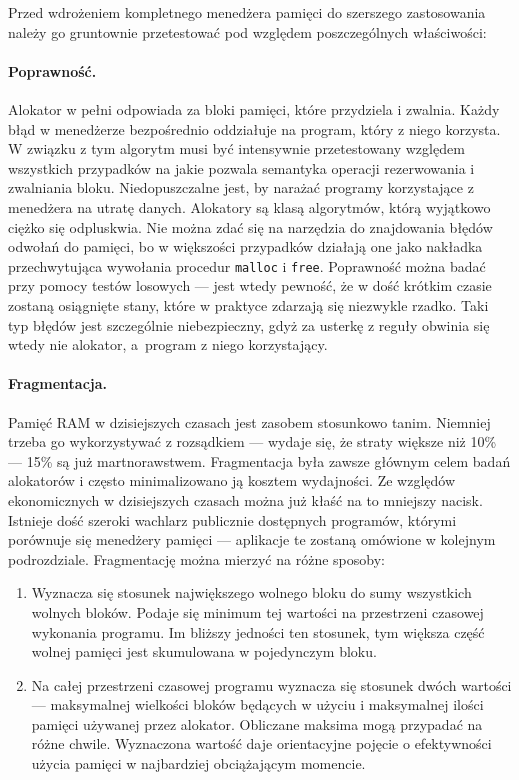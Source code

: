 \documentclass[12pt,a4paper,titlepage,twoside]{mwart}
\begin{document}
Przed wdrożeniem kompletnego menedżera pamięci do szerszego zastosowania należy
go gruntownie przetestować pod względem poszczególnych właściwości:

\paragraph{Poprawność.} Alokator w pełni odpowiada za bloki pamięci, które
przydziela i zwalnia. Każdy błąd w menedżerze bezpośrednio oddziałuje na
program, który z niego korzysta. W związku z tym algorytm musi być intensywnie
przetestowany względem wszystkich przypadków na jakie pozwala semantyka
operacji rezerwowania i zwalniania bloku. Niedopuszczalne jest, by narażać
programy korzystające z menedżera na utratę danych. Alokatory są klasą
algorytmów, którą wyjątkowo ciężko się odpluskwia. Nie można zdać się na
narzędzia do znajdowania błędów odwołań do pamięci, bo w większości przypadków
działają one jako nakładka przechwytująca wywołania procedur \texttt{malloc} i
\texttt{free}. Poprawność można badać przy pomocy testów losowych --- jest wtedy
pewność, że w dość krótkim czasie zostaną osiągnięte stany, które w praktyce
zdarzają się niezwykle rzadko. Taki typ błędów jest szczególnie niebezpieczny,
gdyż za usterkę z reguły obwinia się wtedy nie alokator, a~program z niego
korzystający.

\paragraph{Fragmentacja.} Pamięć RAM w dzisiejszych czasach jest zasobem
stosunkowo tanim. Niemniej trzeba go wykorzystywać z rozsądkiem --- wydaje się,
że straty większe niż 10\% --- 15\% są już martnorawstwem. Fragmentacja była
zawsze głównym celem badań alokatorów i często minimalizowano ją kosztem
wydajności. Ze względów ekonomicznych w dzisiejszych czasach można już kłaść na
to mniejszy nacisk. Istnieje dość szeroki wachlarz publicznie dostępnych
programów, którymi porównuje się menedżery pamięci --- aplikacje te zostaną
omówione w kolejnym podrozdziale. Fragmentację można mierzyć na różne sposoby:

\begin{enumerate}

\item Wyznacza się stosunek największego wolnego bloku do sumy wszystkich
wolnych bloków. Podaje się minimum tej wartości na przestrzeni czasowej
wykonania programu. Im bliższy jedności ten stosunek, tym większa część wolnej
pamięci jest skumulowana w pojedynczym bloku.

\vspace{1ex}

\item Na całej przestrzeni czasowej programu wyznacza się stosunek dwóch
wartości --- maksymalnej wielkości bloków będących w użyciu i maksymalnej ilości
pamięci używanej przez alokator. Obliczane maksima mogą przypadać na różne
chwile. Wyznaczona wartość daje orientacyjne pojęcie o efektywności użycia
pamięci w najbardziej obciążającym momencie.

\end{enumerate}
\end{document}
